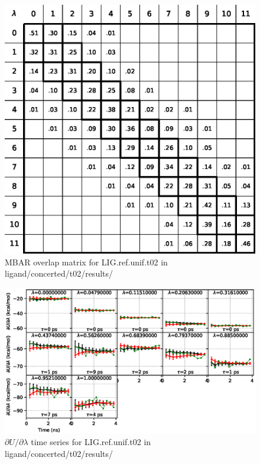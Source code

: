 \documentclass[journal=jctcce,manuscript=article,hyperref=false]{achemso}
\begin{document}
\begin{figure}
\includegraphics[clip,width=6in]{ligand.concerted.t02.results..S.eps}\vspace{-0.3cm}
\caption{MBAR overlap matrix for LIG.ref.unif.t02 in ligand/concerted/t02/results/}
\end{figure}


\begin{figure}
\includegraphics[clip,width=6in]{ligand.concerted.t02.results..DVDLvsT.eps}\vspace{-0.3cm}
\caption{$\partial U/\partial\lambda$ time series for LIG.ref.unif.t02 in ligand/concerted/t02/results/}
\end{figure}
\end{document}
